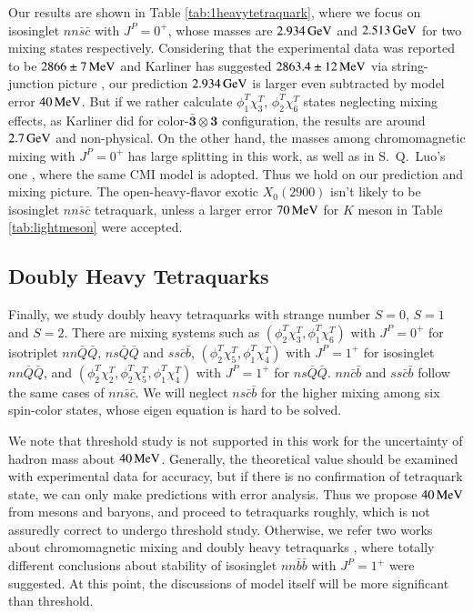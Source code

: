 \documentclass[prd,twocolumn,floatfix,nofootinbib]{revtex4}
\begin{document}
Our results are shown in Table \ref{tab:1heavytetraquark}, where we focus on isosinglet $nn\bar{s}\bar{c}$ with $J^{P}=0^{+}$, whose masses are $2.934\,{\rm GeV}$ and $2.513\,{\rm GeV}$ for two mixing states respectively.
Considering that the experimental data was reported to be $2866\pm 7\,{\rm MeV}$ \cite{LHCb:2020kd} and Karliner has suggested $2863.4\pm 12\,{\rm MeV}$ via string-junction picture \cite{Karliner:2020vsi},
our prediction $2.934\,{\rm GeV}$ is larger even subtracted by model error $40\,{\rm MeV}$.
But if we rather calculate $\phi_{1}^{T}\chi_{3}^{T}$, $\phi_{2}^{T}\chi_{6}^{T}$ states neglecting mixing effects, as Karliner did for color-$\boldsymbol{\bar{3}}\otimes\boldsymbol{3}$ configuration, the results are around $2.7\,{\rm GeV}$ and non-physical.
On the other hand, the masses among chromomagnetic mixing with $J^{P}=0^{+}$ has large splitting in this work, as well as in S.~Q.~Luo's one \cite{Luo:2017eub}, where the same CMI model is adopted.
Thus we hold on our prediction and mixing picture. The open-heavy-flavor exotic $X_{0}(2900)$ isn't likely to be isosinglet $nn\bar{s}\bar{c}$ tetraquark, unless a larger error $70\,{\rm MeV}$ for $K$ meson in Table \ref{tab:lightmeson} were accepted.


\subsection{Doubly Heavy Tetraquarks}
Finally, we study doubly heavy tetraquarks with strange number $S=0$, $S=1$ and $S=2$.
There are mixing systems such as $(\phi_{2}^{T}\chi_{3}^{T},\phi_{1}^{T}\chi_{6}^{T})$ with $J^{P}=0^{+}$ for isotriplet $nn\bar{Q}\bar{Q}$, $ns\bar{Q}\bar{Q}$ and $ss\bar{c}\bar{b}$,
$(\phi_{2}^{T}\chi_{5}^{T},\phi_{1}^{T}\chi_{4}^{T})$ with $J^{P}=1^{+}$ for isosinglet $nn\bar{Q}\bar{Q}$,
and $(\phi_{2}^{T}\chi_{2}^{T},\phi_{2}^{T}\chi_{5}^{T},\phi_{1}^{T}\chi_{4}^{T})$ with $J^{P}=1^{+}$ for $ns\bar{Q}\bar{Q}$.
$nn\bar{c}\bar{b}$ and $ss\bar{c}\bar{b}$ follow the same cases of $nn\bar{s}\bar{c}$. We will neglect $ns\bar{c}\bar{b}$ for the higher mixing among six spin-color states, whose eigen equation is hard to be solved.

We note that threshold study is not supported in this work for the uncertainty of hadron mass about $40\,{\rm MeV}$. 
Generally, the theoretical value should be examined with experimental data for accuracy, but if there is no confirmation of tetraquark state, we can only make predictions with error analysis.
Thus we propose $40\,{\rm MeV}$ from mesons and baryons, and proceed to tetraquarks roughly, which is not assuredly correct to undergo threshold study. 
Otherwise, we refer two works about chromomagnetic mixing and doubly heavy tetraquarks \cite{Luo:2017eub,Lu:2020rog}, where totally different conclusions about stability of isosinglet $nn\bar{b}\bar{b}$ with $J^{P}=1^{+}$ were suggested.
At this point, the discussions of model itself will be more significant than threshold.
\end{document}
